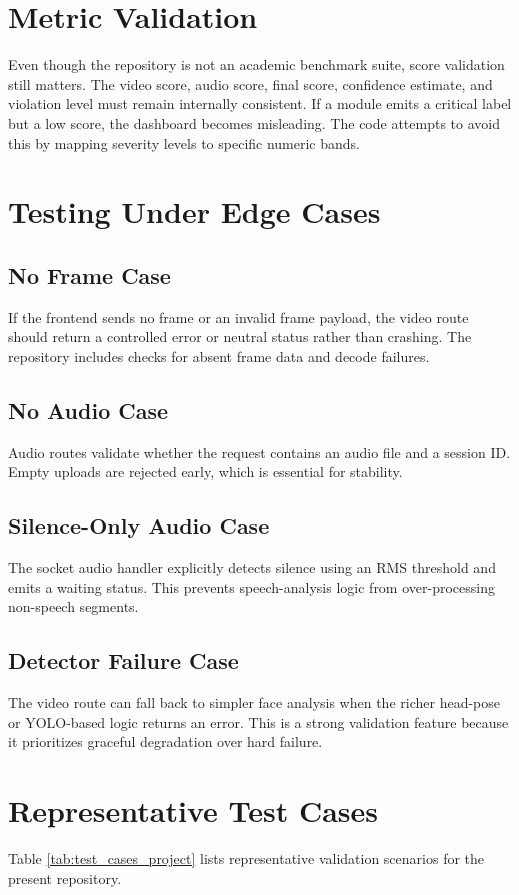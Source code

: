 \documentclass[12pt,a4paper]{extreport}
\begin{document}
\section{Metric Validation}
Even though the repository is not an academic benchmark suite, score validation still matters. The video score, audio score, final score, confidence estimate, and violation level must remain internally consistent. If a module emits a critical label but a low score, the dashboard becomes misleading. The code attempts to avoid this by mapping severity levels to specific numeric bands.

\section{Testing Under Edge Cases}
\subsection{No Frame Case}
If the frontend sends no frame or an invalid frame payload, the video route should return a controlled error or neutral status rather than crashing. The repository includes checks for absent frame data and decode failures.

\subsection{No Audio Case}
Audio routes validate whether the request contains an audio file and a session ID. Empty uploads are rejected early, which is essential for stability.

\subsection{Silence-Only Audio Case}
The socket audio handler explicitly detects silence using an RMS threshold and emits a waiting status. This prevents speech-analysis logic from over-processing non-speech segments.

\subsection{Detector Failure Case}
The video route can fall back to simpler face analysis when the richer head-pose or YOLO-based logic returns an error. This is a strong validation feature because it prioritizes graceful degradation over hard failure.

\section{Representative Test Cases}
Table \ref{tab:test_cases_project} lists representative validation scenarios for the present repository.
\end{document}
